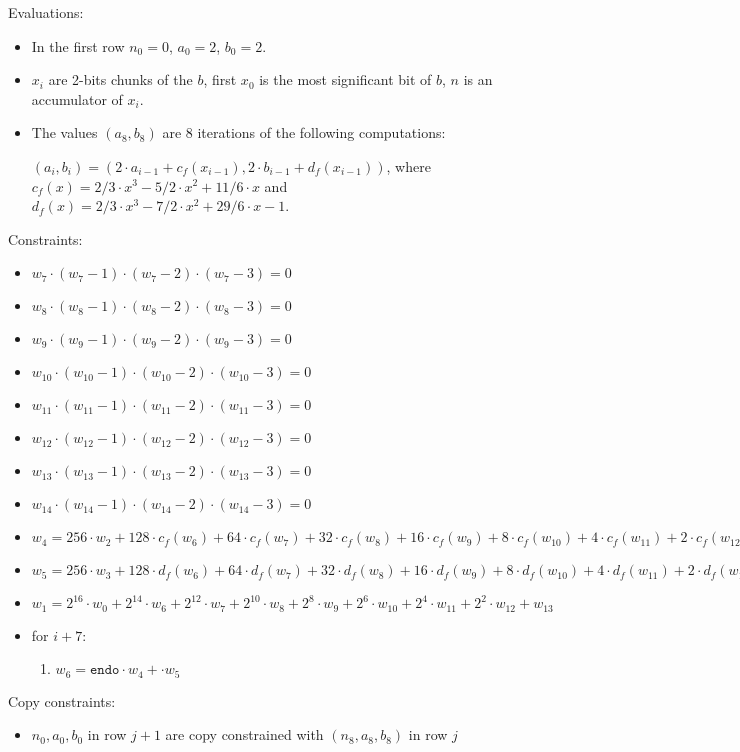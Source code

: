 Evaluations:
\begin{itemize}
	\item In the first row $n_0 = 0$, $a_0 = 2$, $b_0 = 2$.
	\item $x_i$ are 2-bits chunks of the $b$, first $x_0$ is the most significant bit of $b$, $n$ is an accumulator of $x_i$.
	\item The values $(a_8, b_8) $ are $8$ iterations of the following computations:
	\begin{center}
	$(a_i, b_i) = (2\cdot a_{i - 1} + c_f(x_{i - 1}), 2\cdot b_{i - 1} + d_f(x_{i - 1}))$, where $c_f(x) = 2/3\cdot x^3 - 5/2\cdot x^2 + 11/6 \cdot x$ and $d_f(x) = 2/3 \cdot x^3 - 7/2 \cdot x^2 + 29/6 \cdot x - 1$.
	\end{center}

\end{itemize}

Constraints:
\begin{itemize}
    \item $w_{7} \cdot (w_{7} - 1) \cdot (w_{7} - 2)\cdot (w_{7} - 3)  = 0$
    \item $w_{8} \cdot (w_{8} - 1) \cdot (w_{8} - 2)\cdot (w_{8} - 3)  = 0$
    \item $w_{9} \cdot (w_{9} - 1) \cdot (w_{9} - 2)\cdot (w_{9} - 3)  = 0$
    \item $w_{10} \cdot (w_{10} - 1) \cdot (w_{10} - 2)\cdot (w_{10} - 3)  = 0$
    \item $w_{11} \cdot (w_{11} - 1) \cdot (w_{11} - 2)\cdot (w_{11} - 3)  = 0$
    \item $w_{12} \cdot (w_{12} - 1) \cdot (w_{12} - 2)\cdot (w_{12} - 3)  = 0$
    \item $w_{13} \cdot (w_{13} - 1) \cdot (w_{13} - 2)\cdot (w_{13} - 3)  = 0$
    \item $w_{14} \cdot (w_{14} - 1) \cdot (w_{14} - 2)\cdot (w_{14} - 3)  = 0$
    \item $w_{4} = 256 \cdot w_{2} + 128 \cdot c_f(w_6) + 64 \cdot c_f(w_7) + 32 \cdot c_f(w_8) + 16 \cdot c_f(w_9) + 8 \cdot c_f(w_{10}) + 4 \cdot c_f(w_{11}) + 2 \cdot c_f(w_{12}) + c_f(w_{13})$
    \item $w_{5} = 256 \cdot w_{3} + 128 \cdot d_f(w_6) + 64 \cdot d_f(w_7) + 32 \cdot d_f(w_8) + 16 \cdot d_f(w_9) + 8 \cdot d_f(w_{10}) + 4 \cdot d_f(w_{11}) + 2 \cdot d_f(w_{12}) + d_f(w_{13})$
    \item $w_{1} = 2^{16} \cdot w_{0} + 2^{14} \cdot w_6 + 2^{12} \cdot w_7 + 2^{10} \cdot w_8 + 2^8 \cdot w_9 + 2^6 \cdot w_{10} + 2^4 \cdot w_{11} + 2^2 \cdot w_{12} + w_{13}$
	\item for $i + 7$:
	\begin{enumerate}
		\item $w_{6} = \texttt{endo} \cdot w_{4} +  \cdot w_{5}$
	\end{enumerate}
\end{itemize}

    Copy constraints:
    \begin{itemize}
    \item $n_0, a_0, b_0$ in row $j + 1$ are copy constrained with $(n_8, a_8, b_8)$ in row $j$ 
    \end{itemize}